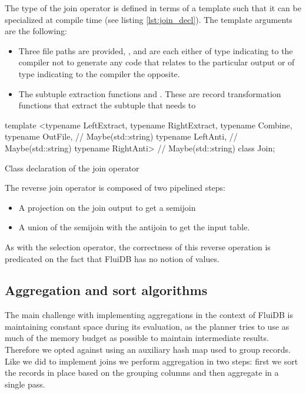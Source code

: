 The type of the join operator is defined in terms of a template such
that it can be specialized at compile time (see listing
\ref{lst:join_decl}). The template arguments are the following:

\begin{itemize}
\item Three file paths are provided, ,  and
   are each either of type  indicating to
  the compiler not to generate any code that relates to the particular
  output or of type  indicating to the compiler
  the opposite.
\item The subtuple extraction functions  and
  . These are record transformation functions that
  extract the subtuple that needs to
\end{itemize}

\begin{code}
\begin{cppcode}
template <typename LeftExtract, typename RightExtract, typename Combine,
          typename OutFile,    // Maybe(std::string)
          typename LeftAnti,   // Maybe(std::string)
          typename RightAnti>  // Maybe(std::string)
class Join;
\end{cppcode}
\caption{\label{lst:join_decl}Class declaration of the join operator}
\end{code}

The reverse join operator is composed of two pipelined steps:

\begin{itemize}
\item A projection on the join output to get a semijoin
\item A union of the semijoin with the antijoin to get the input table.
\end{itemize}

As with the selection operator, the correctness of this reverse
operation is predicated on the fact that FluiDB has no notion of
 values.


\subsection{Aggregation and sort algorithms}

The main challenge with implementing aggregations in the context of
FluiDB is maintaining constant space during its evaluation, as the
planner tries to use as much of the memory budget as possible to
maintain intermediate results. Therefore we opted against using an
auxiliary hash map used to group records. Like we did to implement
joins we perform aggregation in two steps: first we sort the records
in place based on the grouping columns and then aggregate in a single
pass.
